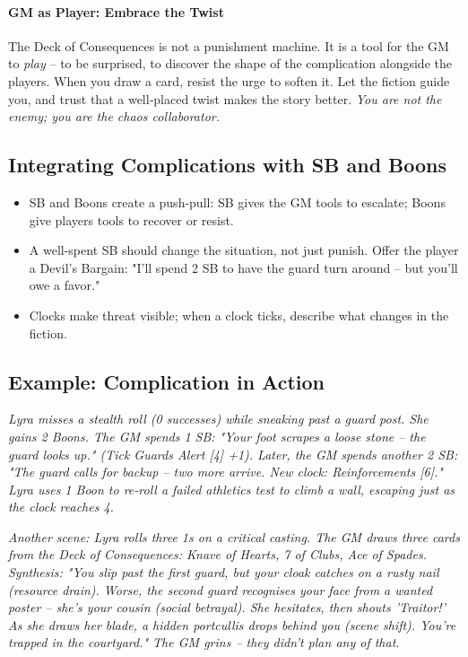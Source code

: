 \paragraph{GM as Player: Embrace the Twist}
The Deck of Consequences is not a punishment machine. It is a tool for the GM to \textit{play} – to be surprised, to discover the shape of the complication alongside the players. When you draw a card, resist the urge to soften it. Let the fiction guide you, and trust that a well‑placed twist makes the story better. \textit{You are not the enemy; you are the chaos collaborator.}

\subsection{Integrating Complications with SB and Boons}
\begin{itemize}
  \item SB and Boons create a push-pull: SB gives the GM tools to escalate; Boons give players tools to recover or resist.
  \item A well-spent SB should change the situation, not just punish. Offer the player a Devil's Bargain: "I'll spend 2 SB to have the guard turn around – but you'll owe a favor."
  \item Clocks make threat visible; when a clock ticks, describe what changes in the fiction.
\end{itemize}

\subsection{Example: Complication in Action}
\emph{Lyra misses a stealth roll (0 successes) while sneaking past a guard post. She gains 2 Boons. The GM spends 1 SB: "Your foot scrapes a loose stone – the guard looks up." (Tick Guards Alert [4] +1). Later, the GM spends another 2 SB: "The guard calls for backup – two more arrive. New clock: Reinforcements [6]." Lyra uses 1 Boon to re-roll a failed athletics test to climb a wall, escaping just as the clock reaches 4.}

\emph{Another scene: Lyra rolls three 1s on a critical casting. The GM draws three cards from the Deck of Consequences: Knave of Hearts, 7 of Clubs, Ace of Spades. Synthesis: "You slip past the first guard, but your cloak catches on a rusty nail (resource drain). Worse, the second guard recognises your face from a wanted poster – she's your cousin (social betrayal). She hesitates, then shouts 'Traitor!' As she draws her blade, a hidden portcullis drops behind you (scene shift). You're trapped in the courtyard." The GM grins – they didn't plan any of that.}